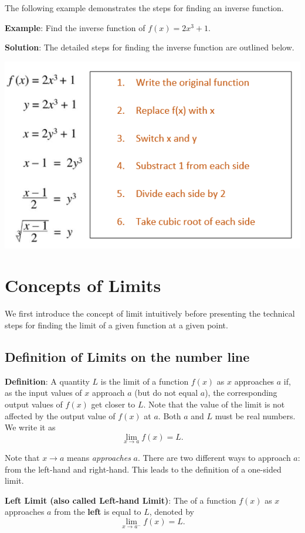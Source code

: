 \documentclass[
]{book}
\begin{document}
The following example demonstrates the steps for finding an inverse function.

\textbf{Example}: Find the inverse function of \(f(x) = 2x^3 + 1\).

\textbf{Solution}: The detailed steps for finding the inverse function are outlined below.

\begin{center}\includegraphics[width=0.55\linewidth]{img01/w01note11-FindingInverseFun} \end{center}

\hypertarget{concepts-of-limits}{%
\section{Concepts of Limits}\label{concepts-of-limits}}

We first introduce the concept of limit intuitively before presenting the technical steps for finding the limit of a given function at a given point.

\hypertarget{definition-of-limits-on-the-number-line}{%
\subsection{Definition of Limits on the number line}\label{definition-of-limits-on-the-number-line}}

\textbf{Definition}: A quantity \(L\) is the limit of a function \(f(x)\) as \(x\) approaches \(a\) if, as the input values of \(x\) approach \(a\) (but do not equal \(a\)), the corresponding output values of \(f(x)\) get closer to \(L\). Note that the value of the limit is not affected by the output value of \(f(x)\) at \(a\). Both \(a\) and \(L\) must be real numbers. We write it as \[
\lim_{x \to a} f(x) = L.
\]

Note that \(x \to a\) means \emph{approaches} \(a\). There are two different ways to approach \(a\): from the left-hand and right-hand. This leads to the definition of a one-sided limit.

\textbf{Left Limit (also called Left-hand Limit)}: The of a function \(f(x)\) as \(x\) approaches \(a\) from the \textbf{left} is equal to \(L\), denoted by
\[
\lim_{x \to a^-} f(x) = L.
\]
\end{document}
